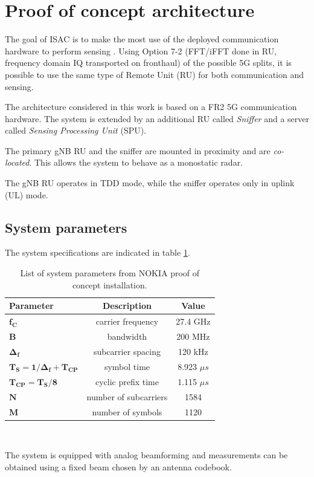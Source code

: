 \section{Proof of concept architecture}
\label{sec:intro-PoCarchitecture}

The goal of ISAC is to make the most use of the deployed communication hardware to perform sensing \cite{Wild_Grudnitsky_Mandelli_Henninger_Guan_Schaich_2023}. Using Option 7-2 (FFT/iFFT done in RU, frequency domain IQ transported on fronthaul) of the possible 5G splits, it is possible to use the same type of Remote Unit (RU) for both communication and sensing.

The architecture considered in this work is based on a FR2 5G communication hardware. The system is extended by an additional RU called \textit{Sniffer} and a server called \textit{Sensing Processing Unit} (SPU).

The primary gNB RU and the sniffer are mounted in proximity and are \textit{co-located}. This allows the system to behave as a monostatic radar.

The gNB RU operates in TDD mode, while the sniffer operates only in uplink (UL) mode.

\subsection{System parameters}

The system specifications are indicated in table \ref{table:PoCparams}.

\begin{table}[H]
    \centering 
    \begin{tabular}{|p{9em} c c |}
    \hline
    \rowcolor{bluepoli!40} %
     \textbf{Parameter} & \textbf{Description} & \textbf{Value}  \T\B \\
    \hline \hline
    $\bm{f_C}$ & carrier frequency & 27.4 GHz \T\B \\
    $\bm{B}$ & bandwidth & 200 MHz \T\B\\
    $\bm{\Delta_f}$ & subcarrier spacing & 120 kHz  \T\B\\
    $\bm{T_S = 1/\Delta_f + T_{CP}}$ & symbol time & 8.923 $\mu s$  \T\B\\
    $\bm{T_{CP} = T_S/8}$ & cyclic prefix time & 1.115 $\mu s$  \T\B\\
    $\bm{N}$ & number of subcarriers & 1584  \T\B\\
    $\bm{M}$ & number of symbols & 1120  \B\\

    \hline
    \end{tabular}
    \\[10pt]
    \caption{List of system parameters from NOKIA proof of concept installation.}
    \label{table:PoCparams}
\end{table}

The system is equipped with analog beamforming and measurements can be obtained using a fixed beam chosen by an antenna codebook.
